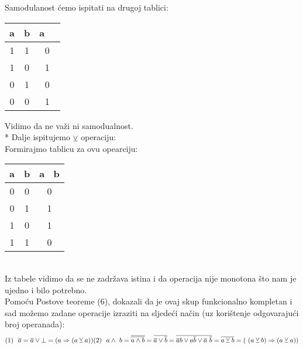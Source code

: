 \documentclass[12pt]{article}
\begin{document}
\begin{enumerate}
		  Samodulanost ćemo ispitati na drugoj tablici: 
		  
		  \begin{tabular}{|c|c|c|}
    	    \hline a & b & a~\wedge~\overline{b} \\
    	    \hline 1 & 1 & 0 \\
    	    \hline 1 & 0 & 1 \\
    	    \hline 0 & 1 & 0 \\
        	\hline 0 & 0 & 1 \\
        	\hline
          \end{tabular}
          
          Vidimo da ne važi ni samodualnost. \\
          
          * Dalje ispitujemo {$\veebar{}$} operaciju: \\   
          Formirajmo tablicu za ovu opearciju:
		  
		  \begin{tabular}{|c|c|c|}
    	    \hline a & b & a \veebar{}~b \\
    	    \hline 0 & 0 & 0 \\
    	    \hline 0 & 1 & 1 \\
    	    \hline 1 & 0 & 1 \\
        	\hline 1 & 1 & 0 \\
        	\hline
        	
          \end{tabular}
          \\
          
		  Iz tabele vidimo da se ne zadržava istina i da operacija nije monotona što nam je ujedno i bilo potrebno. \\
		  
		  Pomoću Postove teoreme (6), dokazali da je ovaj skup funkcionalno kompletan i sad možemo zadane operacije izraziti na sljedeći način (uz korištenje odgovarajući broj operanada): \\	  
		  \begin{equation*}
		      
		      (1)~~\overline{a} = \overline{a} \vee \bot = (a \Rightarrow (a \veebar{} a)) \\
		      
		      (2)~~a \wedge~b = \overline{\overline{a \wedge b}} = \overline{\overline{a} \vee \overline{b}} = \overline{\overline{a}b \vee a\overline{b} \vee \overline{a}~\overline{b}} = \overline{a \veebar{} b} = (~(a \veebar{} b) \Rightarrow (a \veebar{} a)) \\


\end{equation*}
\end{enumerate}
\end{document}
